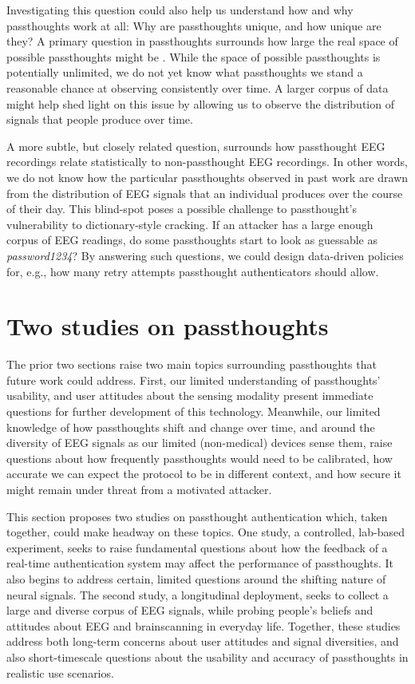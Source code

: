\documentclass[sigconf]{acmart}
\begin{document}
Investigating this question could also help us understand how and why passthoughts work at all: Why are passthoughts unique, and how unique are they?
A primary question in passthoughts surrounds how large the real space of possible passthoughts might be \cite{Thorpe2005}.
While the space of possible passthoughts is potentially unlimited, we do not yet know what passthoughts we stand a reasonable chance at observing consistently over time.
A larger corpus of data might help shed light on this issue by allowing us to observe the distribution of signals that people produce over time.

A more subtle, but closely related question, surrounds how passthought EEG recordings relate statistically to non-passthought EEG recordings.
In other words, we do not know how the particular passthoughts observed in past work are drawn from the distribution of EEG signals that an individual produces over the course of their day.
This blind-spot poses a possible challenge to passthought's vulnerability to dictionary-style cracking.
If an attacker has a large enough corpus of EEG readings, do some passthoughts start to look as guessable as \emph{password1234}?
By answering such questions, we could design data-driven policies for, e.g., how many retry attempts passthought authenticators should allow.

\section{Two studies on passthoughts}
\label{sec:org649bbe2}

The prior two sections raise two main topics surrounding passthoughts that future work could address. 
First, our limited understanding of passthoughts' usability, and user attitudes about the sensing modality present immediate questions for further development of this technology.
Meanwhile, our limited knowledge of how passthoughts shift and change over time, and around the diversity of EEG signals as our limited (non-medical) devices sense them,
raise questions about how frequently passthoughts would need to be calibrated, how accurate we can expect the protocol to be in different context, and how secure it might remain under threat from a motivated attacker.

This section proposes two studies on passthought authentication which, taken together, could make headway on these topics.
One study, a controlled, lab-based experiment, seeks to raise fundamental questions about how the feedback of a real-time authentication system may affect the performance of passthoughts.
It also begins to address certain, limited questions around the shifting nature of neural signals.
The second study, a longitudinal deployment, seeks to collect a large and diverse corpus of EEG signals, while probing people's beliefs and attitudes about EEG and brainscanning in everyday life.
Together, these studies address both long-term concerns about user attitudes and signal diversities, and also short-timescale questions about the usability and accuracy of passthoughts in realistic use scenarios.
\end{document}
